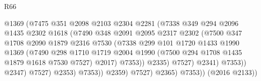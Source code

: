 \begin{lexlean}{R66}
\begin{coremodule}
                                    @1369
                                    (@7475
                                      @351
                                      @2098
                                      @2103
                                      @2304
                                      @2281
                                      (@7338
                                        @349
                                        @294
                                        @2096
                                        @1435
                                        @2302
                                        @1618
                                        (@7490
                                          @348
                                          @2091
                                          @2095
                                          @2317
                                          @2302
                                          (@7500
                                            @347
                                            @1708
                                            @2090
                                            @1879
                                            @2316
                                            @7530
                                            (@7338
                                              @299
                                              @101
                                              @1720
                                              @1433
                                              @1990
                                              @1369
                                              (@7490
                                                @298
                                                @1710
                                                @1719
                                                @2004
                                                @1990
                                                (@7500 @294 @1708 @1435 @1879 @1618 @7530 @7527)
                                                @2017)
                                              @7353))
                                          @2335)
                                        @7527)
                                      @2341)
                                    @7353))
                                @2347)
                              @7527)
                            @2353)
                          @7353))
                      @2359)
                    @7527)
                  @2365)
                @7353))
            (@2016 @2133))

\end{coremodule}
\end{lexlean}

